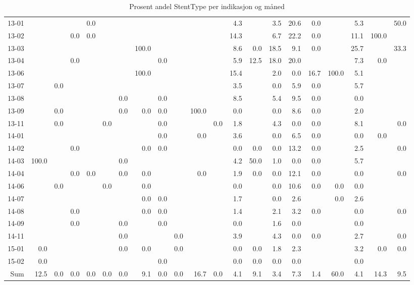 \documentclass[presentation,xcolor=pdftex,dvipsnames,table]{beamer}
\begin{document}
\begin{frame}
\begin{tiny}
\begin{table}[ht]
\begin{tabular}{rrrrrrrrrrrrrrrrrrrrr}
  \midrule
13-01 &  &  &  & 0.0 &  &  &  &  &  &  &  & 4.3 &  & 3.5 & 20.6 & 0.0 &  & 5.3 &  & 50.0 \\ 
  13-02 &  &  & 0.0 & 0.0 &  &  &  &  &  &  &  & 14.3 &  & 6.7 & 22.2 & 0.0 &  & 11.1 & 100.0 &  \\ 
  13-03 &  &  &  &  &  &  & 100.0 &  &  &  &  & 8.6 & 0.0 & 18.5 & 9.1 & 0.0 &  & 25.7 &  & 33.3 \\ 
  13-04 &  &  & 0.0 &  &  &  &  & 0.0 &  &  &  & 5.9 & 12.5 & 18.0 & 20.0 &  &  & 7.3 & 0.0 &  \\ 
  13-06 &  &  &  &  &  &  & 100.0 &  &  &  &  & 15.4 &  & 2.0 & 0.0 & 16.7 & 100.0 & 5.1 &  &  \\ 
  13-07 &  & 0.0 &  &  &  &  &  &  &  &  &  & 3.5 &  & 0.0 & 5.9 & 0.0 &  & 5.7 &  &  \\ 
  13-08 &  &  &  &  &  & 0.0 &  & 0.0 &  &  &  & 8.5 &  & 5.4 & 9.5 & 0.0 &  & 0.0 &  &  \\ 
  13-09 &  & 0.0 &  &  &  & 0.0 & 0.0 & 0.0 &  & 100.0 &  & 0.0 &  & 0.0 & 8.6 & 0.0 &  & 2.0 &  &  \\ 
  13-11 &  & 0.0 &  &  & 0.0 &  &  & 0.0 &  &  & 0.0 & 1.8 &  & 4.3 & 0.0 & 0.0 &  & 8.1 &  & 0.0 \\ 
  14-01 &  &  &  &  &  &  &  & 0.0 &  & 0.0 &  & 3.6 &  & 0.0 & 6.5 & 0.0 &  & 0.0 & 0.0 &  \\ 
  14-02 &  &  & 0.0 &  &  &  & 0.0 & 0.0 &  &  &  & 0.0 & 0.0 & 0.0 & 13.2 & 0.0 &  & 2.5 &  & 0.0 \\ 
  14-03 & 100.0 &  &  &  &  & 0.0 &  &  &  &  &  & 4.2 & 50.0 & 1.0 & 0.0 & 0.0 &  & 5.7 &  &  \\ 
  14-04 &  &  & 0.0 & 0.0 &  & 0.0 & 0.0 &  &  & 0.0 &  & 1.9 & 0.0 & 0.0 & 12.1 & 0.0 &  & 0.0 &  & 0.0 \\ 
  14-06 &  & 0.0 &  &  & 0.0 &  & 0.0 &  &  &  &  & 0.0 &  & 0.0 & 10.6 & 0.0 & 0.0 & 0.0 &  &  \\ 
  14-07 &  &  &  &  &  &  & 0.0 & 0.0 &  &  &  & 1.7 &  & 0.0 & 2.6 &  & 0.0 & 2.6 &  &  \\ 
  14-08 &  &  & 0.0 &  &  &  & 0.0 & 0.0 &  &  &  & 1.4 &  & 2.1 & 3.2 & 0.0 &  & 0.0 &  & 0.0 \\ 
  14-09 &  &  & 0.0 &  &  & 0.0 &  & 0.0 &  &  &  & 0.0 &  & 1.6 & 0.0 &  &  & 0.0 &  &  \\ 
  14-11 &  &  &  &  &  & 0.0 &  &  & 0.0 &  &  & 3.9 &  & 4.3 & 0.0 & 0.0 &  & 2.7 &  & 0.0 \\ 
  15-01 & 0.0 &  &  &  &  & 0.0 & 0.0 &  & 0.0 &  &  & 0.0 & 0.0 & 1.8 & 2.3 &  &  & 3.2 & 0.0 & 0.0 \\ 
  15-02 & 0.0 &  &  &  &  &  &  & 0.0 &  &  &  & 0.0 & 0.0 & 0.0 & 0.0 &  &  & 0.0 &  &  \\ 
  Sum & 12.5 & 0.0 & 0.0 & 0.0 & 0.0 & 0.0 & 9.1 & 0.0 & 0.0 & 16.7 & 0.0 & 4.1 & 9.1 & 3.4 & 7.3 & 1.4 & 60.0 & 4.1 & 14.3 & 9.5 \\ 
   \bottomrule
\end{tabular}
\caption{Prosent andel StentType per indikasjon og måned} 
\end{table}\end{tiny}
\end{frame}
\end{document}
